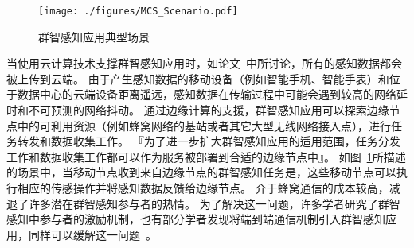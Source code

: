 \begin{figure}[!b]
  \centering
  \vspace{-1em}
  \texttt{[image: ./figures/MCS\_Scenario.pdf]}
  \vspace{-0.5em}
  \caption{群智感知应用典型场景}
  \label{Figure_UIC_MCS}
\end{figure}

当使用云计算技术支撑群智感知应用时，如论文~\cite{DBLP:journals/fgcs/AntonicMPZ16,DBLP:conf/ccnc/MessaoudRG16}中所讨论，所有的感知数据都会被上传到云端。
由于产生感知数据的移动设备（例如智能手机、智能手表）和位于数据中心的云端设备距离遥远，感知数据在传输过程中可能会遇到较高的网络延时和不可预测的网络抖动。
通过边缘计算的支援，群智感知应用可以探索边缘节点中的可利用资源（例如蜂窝网络的基站或者其它大型无线网络接入点），进行任务转发和数据收集工作。
『为了进一步扩大群智感知应用的适用范围，任务分发工作和数据收集工作都可以作为服务被部署到合适的边缘节点中』。
如图~\ref{Figure_UIC_MCS}所描述的场景中，当移动节点收到来自边缘节点的群智感知任务是，这些移动节点可以执行相应的传感操作并将感知数据反馈给边缘节点。
介于蜂窝通信的成本较高，减退了许多潜在群智感知参与者的热情。
为了解决这一问题，许多学者研究了群智感知中参与者的激励机制，也有部分学者发现将端到端通信机制引入群智感知应用，同样可以缓解这一问题~\cite{DBLP:journals/puc/WangLL17}。


